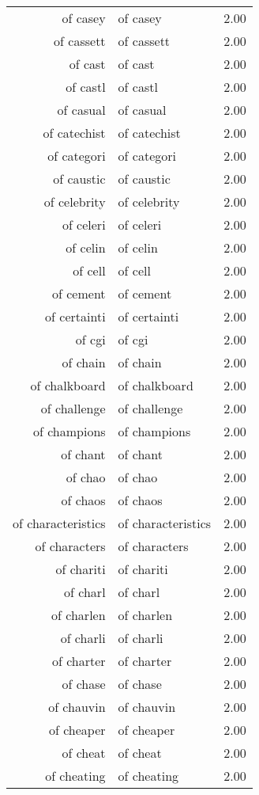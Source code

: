 \begin{table}[ht]
\begin{tabular}{rlr}
  of casey & of casey & 2.00 \\ 
  of cassett & of cassett & 2.00 \\ 
  of cast & of cast & 2.00 \\ 
  of castl & of castl & 2.00 \\ 
  of casual & of casual & 2.00 \\ 
  of catechist & of catechist & 2.00 \\ 
  of categori & of categori & 2.00 \\ 
  of caustic & of caustic & 2.00 \\ 
  of celebrity & of celebrity & 2.00 \\ 
  of celeri & of celeri & 2.00 \\ 
  of celin & of celin & 2.00 \\ 
  of cell & of cell & 2.00 \\ 
  of cement & of cement & 2.00 \\ 
  of certainti & of certainti & 2.00 \\ 
  of cgi & of cgi & 2.00 \\ 
  of chain & of chain & 2.00 \\ 
  of chalkboard & of chalkboard & 2.00 \\ 
  of challenge & of challenge & 2.00 \\ 
  of champions & of champions & 2.00 \\ 
  of chant & of chant & 2.00 \\ 
  of chao & of chao & 2.00 \\ 
  of chaos & of chaos & 2.00 \\ 
  of characteristics & of characteristics & 2.00 \\ 
  of characters & of characters & 2.00 \\ 
  of chariti & of chariti & 2.00 \\ 
  of charl & of charl & 2.00 \\ 
  of charlen & of charlen & 2.00 \\ 
  of charli & of charli & 2.00 \\ 
  of charter & of charter & 2.00 \\ 
  of chase & of chase & 2.00 \\ 
  of chauvin & of chauvin & 2.00 \\ 
  of cheaper & of cheaper & 2.00 \\ 
  of cheat & of cheat & 2.00 \\ 
  of cheating & of cheating & 2.00 \\ 

\end{tabular}
\end{table}
